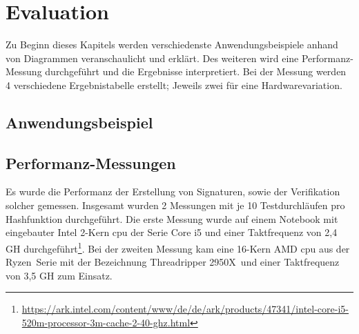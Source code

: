 
\chapter{Evaluation}
\label{ch:Evaluation}
Zu Beginn dieses Kapitels werden verschiedenste Anwendungsbeispiele anhand von Diagrammen veranschaulicht und erklärt. Des weiteren wird eine Performanz-Messung durchgeführt und die Ergebnisse interpretiert. Bei der Messung werden 4 verschiedene Ergebnistabelle erstellt; Jeweils zwei für eine Hardwarevariation.
\section{Anwendungsbeispiel}
\section{Performanz-Messungen}
Es wurde die Performanz der Erstellung von Signaturen, sowie der Verifikation solcher gemessen. Insgesamt wurden 2 Messungen mit je 10 Testdurchläufen pro Hashfunktion durchgeführt. Die erste Messung wurde auf einem Notebook mit eingebauter Intel 2-Kern \gls{cpu} der Serie Core i5 und einer Taktfrequenz von 2,4 GH durchgeführt\footnote{\url{https://ark.intel.com/content/www/de/de/ark/products/47341/intel-core-i5-520m-processor-3m-cache-2-40-ghz.html}}. Bei der zweiten Messung kam eine 16-Kern AMD \gls {cpu} aus der \glqq Ryzen\grqq~Serie mit der Bezeichnung \glqq Threadripper 2950X\grqq~und einer Taktfrequenz von 3,5 GH zum Einsatz.\\

